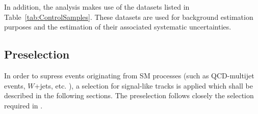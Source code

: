 In addition, the analysis makes use of the datasets listed in Table~\ref{tab:ControlSamples}.
These datasets are used for background estimation purposes and the estimation of their associated systematic uncertainties.
\renewcommand{\arraystretch}{1.5}
\begin{table}[!h]
\centering
\caption{Further datasets used for background estimation.}
\label{tab:ControlSamples}
\end{table}  
\subsection{Preselection}

In order to supress events originating from SM processes (such as QCD-multijet events, $W$+jets, etc. ), a selection for signal-like tracks is applied which shall be described in the following sections.
The preselection follows closely the selection required in \cite{bib:CMS:DT_8TeV}.\\

